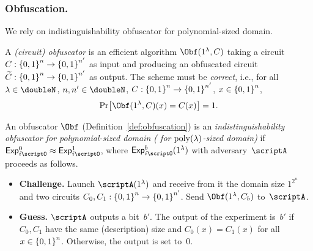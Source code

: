 \subsubsection{Obfuscation.}
We rely on indistinguishability obfuscator for polynomial-sized domain.

\begin{definition}\label{def:obfuscation}
A \emph{(circuit) obfuscator} is an efficient algorithm
$\Obf(1^\lambda,C)$
taking a circuit ${C:{\{0,1\}}^n\to{\{0,1\}}^{n'}}$ as input
and producing an obfuscated circuit ${\widetilde{C}:{\{0,1\}}^n\to{\{0,1\}}^{n'}}$ as output.
The scheme must be \emph{correct}, i.e., for all
${\lambda\in\doubleN}$,
${n,n'\in\doubleN}$,
${C:{\{0,1\}}^n\to{\{0,1\}}^{n'}}$,
${x\in{\{0,1\}}^n}$,
\begin{align*}
\Pr\bigl[
\Obf(1^\lambda,C)(x)=C(x)
\bigr]=1.
\end{align*}
\end{definition}

\begin{definition}
\label{def:obfuscation-security}
An obfuscator $\Obf$ (Definition~\ref{def:obfuscation}) is
an \emph{indistinguishability obfuscator for polynomial-sized domain
({\iO} for $\operatorname{poly}(\lambda)$-sized domain)}
if ${\ExpIO{0}\approx\ExpIO{1}}$,
where $\ExpIO{b}(1^\lambda)$ with adversary~$\scriptA$ proceeds as follows.
\begin{itemize}\upshape
\item\textbf{Challenge.}
Launch $\scriptA(1^\lambda)$ and receive from it
the domain size $1^{2^n}$ and two circuits ${C_0,C_1:{\{0,1\}}^n\to{\{0,1\}}^{n'}}$.
Send $\Obf(1^\lambda,C_b)$ to~$\scriptA$.
\item\textbf{Guess.}
$\scriptA$ outputs a bit~$b'$.
The output of the experiment is~$b'$ if $C_0,C_1$ have the same (description) size and ${C_0(x)=C_1(x)}$ for all~${x\in{\{0,1\}}^n}$.
Otherwise, the output is set to~$0$.
\end{itemize}
\end{definition}
